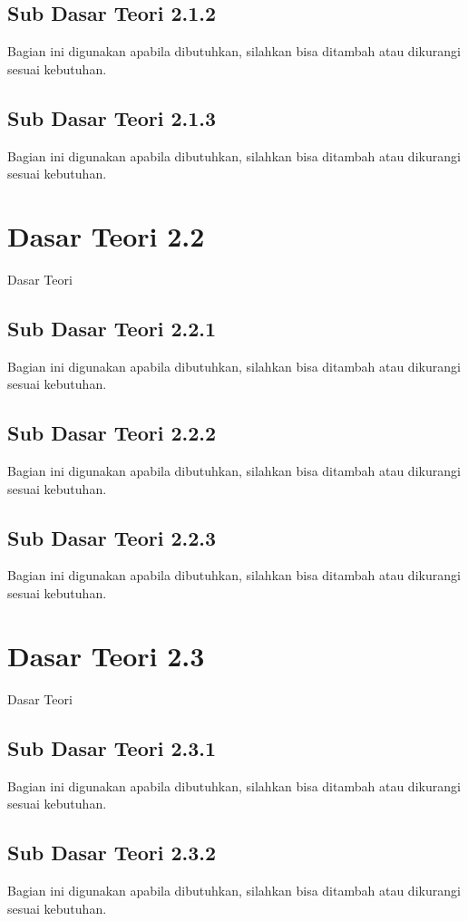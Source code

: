 \subsection{Sub Dasar Teori 2.1.2}
Bagian ini digunakan apabila dibutuhkan, silahkan bisa ditambah atau dikurangi sesuai kebutuhan.

\subsection{Sub Dasar Teori 2.1.3}
Bagian ini digunakan apabila dibutuhkan, silahkan bisa ditambah atau dikurangi sesuai kebutuhan.

\section{Dasar Teori 2.2}
\noindent Dasar Teori

\subsection{Sub Dasar Teori 2.2.1}
Bagian ini digunakan apabila dibutuhkan, silahkan bisa ditambah atau dikurangi sesuai kebutuhan.

\subsection{Sub Dasar Teori 2.2.2}
Bagian ini digunakan apabila dibutuhkan, silahkan bisa ditambah atau dikurangi sesuai kebutuhan.

\subsection{Sub Dasar Teori 2.2.3}
Bagian ini digunakan apabila dibutuhkan, silahkan bisa ditambah atau dikurangi sesuai kebutuhan.

\section{Dasar Teori 2.3}
Dasar Teori

\subsection{Sub Dasar Teori 2.3.1}
Bagian ini digunakan apabila dibutuhkan, silahkan bisa ditambah atau dikurangi sesuai kebutuhan.

\subsection{Sub Dasar Teori 2.3.2}
Bagian ini digunakan apabila dibutuhkan, silahkan bisa ditambah atau dikurangi sesuai kebutuhan.


